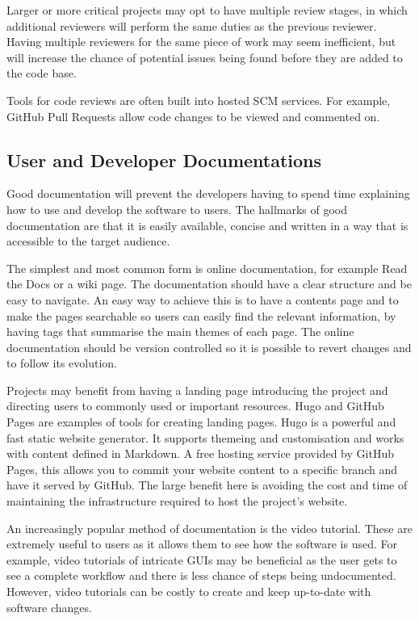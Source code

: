\documentclass[jnr]{iosart2x}
\begin{document}
Larger or more critical projects may opt to have multiple review stages, in which additional reviewers will perform the same duties as the previous reviewer.
Having multiple reviewers for the same piece of work may seem inefficient, but will increase the chance of potential issues being found before they are added to the code base.

Tools for code reviews are often built into hosted SCM services.
For example, GitHub Pull Requests allow code changes to be viewed and commented on.

\subsection{User and Developer Documentations}
\label{Documentation}

Good documentation will prevent the developers having to spend time explaining how to use and develop the software to users.
The hallmarks of good documentation are that it is easily available, concise and written in a way that is accessible to the target audience.

The simplest and most common form is online documentation, for example Read the Docs \cite{Read_The_Docs} or a wiki page.
The documentation should have a clear structure and be easy to navigate.
An easy way to achieve this is to have a contents page and to make the pages searchable so users can easily find the relevant information, by having tags that summarise the main themes of each page.
The online documentation should be version controlled so it is possible to revert changes and to follow its evolution.

Projects may benefit from having a landing page introducing the project and directing users to commonly used or important resources.
Hugo \cite{Hugo} and GitHub Pages \cite{GitHub_Pages} are examples of tools for creating landing pages.
Hugo is a powerful and fast static website generator.
It supports themeing and customisation and works with content defined in Markdown.
A free hosting service provided by GitHub Pages, this allows you to commit your website content to a specific branch and have it served by GitHub.
The large benefit here is avoiding the cost and time of maintaining the infrastructure required to host the project's website.

An increasingly popular method of documentation is the video tutorial.
These are extremely useful to users as it allows them to see how the software is used.
For example, video tutorials of intricate GUIs may be beneficial as the user gets to see a complete workflow and there is less chance of steps being undocumented.
However, video tutorials can be costly to create and keep up-to-date with software changes.
\end{document}
